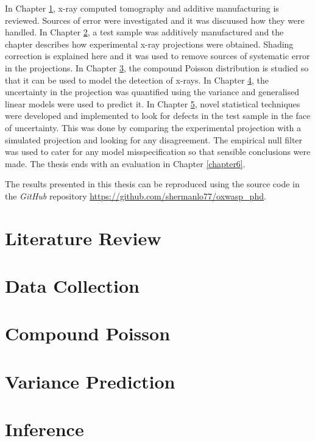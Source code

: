 \documentclass[12pt, a4paper, twoside]{memoir}
\begin{document}
In Chapter \ref{chapter1}, x-ray computed tomography and additive manufacturing is reviewed. Sources of error were investigated and it was discuused how they were handled. In Chapter \ref{chapter2}, a test sample was additively manufactured and the chapter describes how experimental x-ray projections were obtained. Shading correction is explained here and it was used to remove sources of systematic error in the projections. In Chapter \ref{chapter3}, the compound Poisson distribution is studied so that it can be used to model the detection of x-rays. In Chapter \ref{chapter4}, the uncertainty in the projection was quantified using the variance and generalised linear models were used to predict it. In Chapter \ref{chapter5}, novel statistical techniques were developed and implemented to look for defects in the test sample in the face of uncertainty. This was done by comparing the experimental projection with a simulated projection and looking for any disagreement. The empirical null filter was used to cater for any model misspecification so that sensible conclusions were made. The thesis ends with an evaluation in Chapter \ref{chapter6}.

The results presented in this thesis can be reproduced using the source code in the \emph{GitHub} repository \url{https://github.com/shermanlo77/oxwasp_phd}.

\chapter{Literature Review}
\label{chapter1}


\chapter{Data Collection}
\label{chapter2}


\chapter{Compound Poisson}
\label{chapter3}


\chapter{Variance Prediction}
\label{chapter4}


\chapter{Inference}
\label{chapter5}

\end{document}
